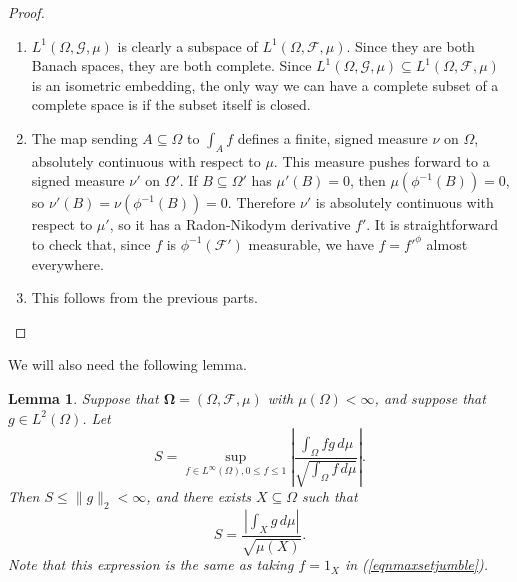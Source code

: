 \documentclass{amsart}
\numberwithin{equation}{section}
\numberwithin{figure}{section}
\newtheorem{lemma}[theorem]{Lemma}
\theoremstyle{definition}
\theoremstyle{remark}
\newcommand{\bOmega}{{\mathbf{\Omega}}}
\newcommand{\cF}{\mathcal{F}}
\newcommand{\cG}{\mathcal{G}}
\begin{document}
\begin{proof}
\begin{enumerate}
\item $L^1(\Omega,\cG,\mu)$ is clearly a subspace of $L^1(\Omega,\cF,\mu)$.
    Since they are both Banach spaces, they are both complete. Since
    $L^1(\Omega,\cG,\mu)\subseteq L^1(\Omega,\cF,\mu)$ is an isometric
    embedding, the only way we can have a {complete} subset of a complete
    space is if the subset itself is closed.
\item The map sending $A \subseteq \Omega$ to $\int_A f$ defines a finite,
    signed measure $\nu$ on $\Omega$, absolutely continuous with respect to
  $\mu$. This measure pushes forward to a signed measure $\nu'$ on
  $\Omega'$. If $B \subseteq \Omega'$ has $\mu'(B)=0$, then
  $\mu(\phi^{-1}(B))=0$, so $\nu'(B)=\nu(\phi^{-1}(B))=0$. Therefore $\nu'$
  is absolutely continuous with respect to $\mu'$, so it has a
  Radon-Nikodym derivative $f'$. It is straightforward to check that, since
  $f$ is $\phi^{-1}(\cF')$ measurable, we have $f=f'^{\phi}$ almost
  everywhere.
\item This follows from the previous parts.
\end{enumerate}
\end{proof}

We will also need the following lemma.

\begin{lemma}\label{lem:auxil1}
Suppose that $\bOmega=(\Omega,\cF,\mu)$ with $\mu(\Omega)<\infty$, and
suppose that $g \in L^2(\Omega)$. Let
\begin{equation} \label{eqnmaxsetjumble}
S=\sup_{f \in L^\infty(\Omega),0 \le f \le 1} \left| \frac{\int_\Omega fg \,d\mu}{\sqrt{\int_\Omega f \,d\mu}}\right|
.\end{equation}
Then $S\leq\|g\|_2<\infty$, and there exists $X \subseteq \Omega$ such that
\[S=\frac{\left|\int_X g \,d\mu\right|}{\sqrt{\mu(X)}}
.\]
Note that this expression is the same as taking $f=1_X$ in (\ref{eqnmaxsetjumble}).
\end{lemma}
\end{document}
